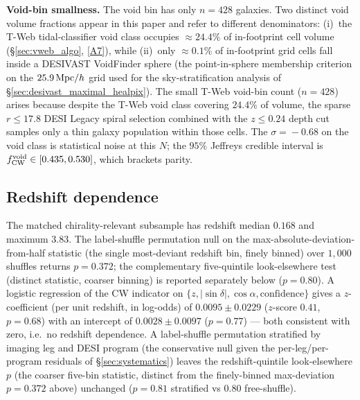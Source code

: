 \documentclass[aps,prd,twocolumn,superscriptaddress,showpacs,preprintnumbers,nofootinbib,longbibliography,floatfix]{revtex4-2}
\newcommand{\repoBase}{https://github.com/Hubify-Projects/bigbounce/blob/main}
\begin{document}
\textbf{Void-bin smallness.} The void bin has only $n\!=\!428$
galaxies. Two distinct void volume fractions appear in this paper and refer to different denominators: (i)~the T-Web tidal-classifier void class occupies ${\approx}24.4\%$ of in-footprint cell volume (\S\ref{sec:vweb_algo}, \href{\repoBase/pipelines/p5\_desi\_chirality/env\_finder/reports/01\_volume\_fractions.json}{[A7]}), while (ii)~only ${\approx}0.1\%$ of in-footprint grid cells fall inside a DESIVAST VoidFinder sphere (the point-in-sphere membership criterion on the $25.9\,{\rm Mpc}/h$ grid used for the sky-stratification analysis of \S\ref{sec:desivast_maximal_healpix}). The small T-Web void-bin count ($n\!=\!428$) arises because despite the T-Web void class covering $24.4\%$ of volume, the sparse $r \le 17.8$ DESI Legacy spiral selection combined with the $z \leq 0.24$ depth cut samples only a thin galaxy population within those cells. The $\sigma\!=\!-0.68$ on the void
class is statistical noise at this $N$; the $95\%$ Jeffreys credible
interval is $f_{\rm CW}^{\rm void} \in [0.435, 0.530]$, which brackets
parity.

\subsection{Redshift dependence}\label{sec:results_z}

The matched chirality-relevant subsample has redshift median $0.168$
and maximum $3.83$. The label-shuffle permutation null on the
max-absolute-deviation-from-half statistic (the single most-deviant
redshift bin, finely binned) over $1{,}000$ shuffles returns
$p\!=\!0.372$; the complementary five-quintile look-elsewhere test
(distinct statistic, coarser binning) is reported separately below
($p = 0.80$).
A logistic regression of the CW indicator on $\{z, |\sin\delta|,
\cos\alpha, \text{confidence}\}$ gives a $z$-coefficient (per unit
redshift, in log-odds) of $0.0095 \pm 0.0229$ ($z$-score $0.41$,
$p = 0.68$) with an intercept of $0.0028 \pm 0.0097$ ($p = 0.77$) —
both consistent with zero, i.e.\ no
redshift dependence. A label-shuffle permutation stratified by
imaging leg and DESI program (the conservative null given the
per-leg/per-program residuals of \S\ref{sec:systematics}) leaves the
redshift-quintile look-elsewhere $p$ (the coarser five-bin statistic,
distinct from the finely-binned max-deviation $p = 0.372$ above)
unchanged ($p = 0.81$ stratified vs $0.80$ free-shuffle).
\end{document}
